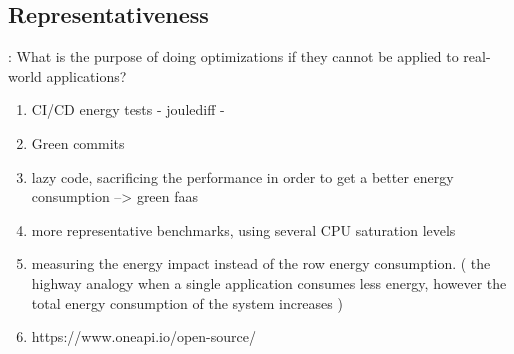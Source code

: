 \subsection*{Representativeness}:
What is the purpose of doing optimizations if they cannot be applied to real-world applications?
\begin{enumerate}
      \item CI/CD energy tests  - joulediff -
      \item Green commits
      \item lazy code, sacrificing the performance in order to get a better energy consumption --> green faas
      \item more representative benchmarks, using several CPU saturation levels
      \item measuring the energy impact instead of the row energy consumption. ( the highway analogy when a single application consumes less energy, however the total energy consumption of the system increases )
      \item https://www.oneapi.io/open-source/
\end{enumerate}
\vfill \strut  %
\cleardoublepage